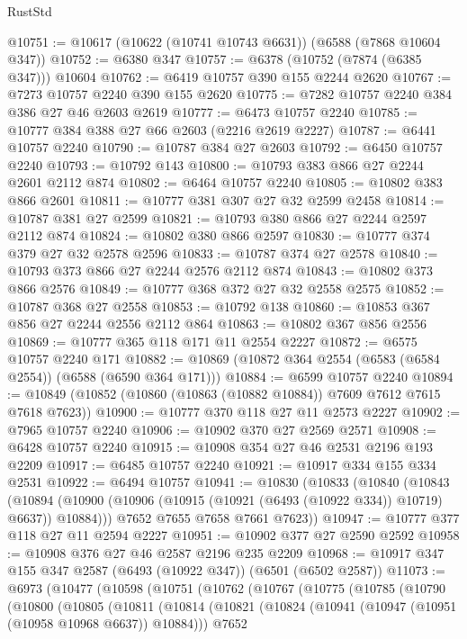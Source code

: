 \begin{lexlean}{RustStd}
\begin{coremodule}
@10751 := @10617 (@10622 (@10741 @10743 @6631)) (@6588 (@7868 @10604 @347))
@10752 := @6380 @347
@10757 := @6378 (@10752 (@7874 (@6385 @347))) @10604
@10762 := @6419 @10757 @390 @155 @2244 @2620
@10767 := @7273 @10757 @2240 @390 @155 @2620
@10775 := @7282 @10757 @2240 @384 @386 @27 @46 @2603 @2619
@10777 := @6473 @10757 @2240
@10785 := @10777 @384 @388 @27 @66 @2603 (@2216 @2619 @2227)
@10787 := @6441 @10757 @2240
@10790 := @10787 @384 @27 @2603
@10792 := @6450 @10757 @2240
@10793 := @10792 @143
@10800 := @10793 @383 @866 @27 @2244 @2601 @2112 @874
@10802 := @6464 @10757 @2240
@10805 := @10802 @383 @866 @2601
@10811 := @10777 @381 @307 @27 @32 @2599 @2458
@10814 := @10787 @381 @27 @2599
@10821 := @10793 @380 @866 @27 @2244 @2597 @2112 @874
@10824 := @10802 @380 @866 @2597
@10830 := @10777 @374 @379 @27 @32 @2578 @2596
@10833 := @10787 @374 @27 @2578
@10840 := @10793 @373 @866 @27 @2244 @2576 @2112 @874
@10843 := @10802 @373 @866 @2576
@10849 := @10777 @368 @372 @27 @32 @2558 @2575
@10852 := @10787 @368 @27 @2558
@10853 := @10792 @138
@10860 := @10853 @367 @856 @27 @2244 @2556 @2112 @864
@10863 := @10802 @367 @856 @2556
@10869 := @10777 @365 @118 @171 @11 @2554 @2227
@10872 := @6575 @10757 @2240 @171
@10882 := @10869 (@10872 @364 @2554 (@6583 (@6584 @2554)) (@6588 (@6590 @364 @171)))
@10884 := @6599 @10757 @2240
@10894 := @10849 (@10852 (@10860 (@10863 (@10882 @10884)) @7609 @7612 @7615 @7618 @7623))
@10900 := @10777 @370 @118 @27 @11 @2573 @2227
@10902 := @7965 @10757 @2240
@10906 := @10902 @370 @27 @2569 @2571
@10908 := @6428 @10757 @2240
@10915 := @10908 @354 @27 @46 @2531 @2196 @193 @2209
@10917 := @6485 @10757 @2240
@10921 := @10917 @334 @155 @334 @2531
@10922 := @6494 @10757
@10941 := @10830
    (@10833
      (@10840
        (@10843
          (@10894 (@10900 (@10906 (@10915 (@10921 (@6493 (@10922 @334)) @10719) @6637)) @10884)))
        @7652
        @7655
        @7658
        @7661
        @7623))
@10947 := @10777 @377 @118 @27 @11 @2594 @2227
@10951 := @10902 @377 @27 @2590 @2592
@10958 := @10908 @376 @27 @46 @2587 @2196 @235 @2209
@10968 := @10917 @347 @155 @347 @2587 (@6493 (@10922 @347)) (@6501 (@6502 @2587))
@11073 := @6973
    (@10477
      (@10598
        (@10751
          (@10762
            (@10767
              (@10775
                (@10785
                  (@10790
                    (@10800
                      (@10805
                        (@10811
                          (@10814
                            (@10821
                              (@10824 (@10941 (@10947 (@10951 (@10958 @10968 @6637)) @10884)))
                              @7652

\end{coremodule}
\end{lexlean}
